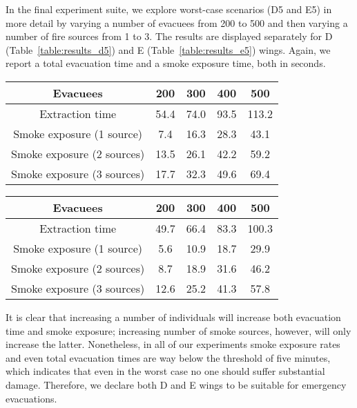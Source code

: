 In the final experiment suite, we explore worst-case scenarios (D5 and E5) in
more detail by varying a number of evacuees from 200 to 500 and then varying
a number of fire sources from 1 to 3.
The results are displayed separately for D (Table~\ref{table:results_d5})
and E (Table~\ref{table:results_e5}) wings.
Again, we report a total evacuation time and a smoke exposure time,
both in seconds.

\begin{center}
    \label{table:results_d5}
    \begin{tabular}{ c | c | c | c | c }
        \hline
        Evacuees & 200 & 300 & 400 & 500 \\
        \hline
        Extraction time & 54.4 & 74.0 & 93.5 & 113.2 \\
        Smoke exposure (1 source) & 7.4 & 16.3 & 28.3 & 43.1 \\
        Smoke exposure (2 sources) & 13.5 & 26.1 & 42.2 & 59.2 \\
        Smoke exposure (3 sources) & 17.7 & 32.3 & 49.6 & 69.4 \\
        \hline
    \end{tabular}
\end{center}

\begin{center}
    \label{table:results_e5}
    \begin{tabular}{ c | c | c | c | c }
        \hline
        Evacuees & 200 & 300 & 400 & 500 \\
        \hline
        Extraction time & 49.7 & 66.4 & 83.3 & 100.3 \\
        Smoke exposure (1 source) & 5.6 & 10.9 & 18.7 & 29.9 \\
        Smoke exposure (2 sources) & 8.7 & 18.9 & 31.6 & 46.2 \\
        Smoke exposure (3 sources) & 12.6 & 25.2 & 41.3 & 57.8 \\
        \hline
    \end{tabular}
\end{center}

It is clear that increasing a number of individuals will increase both
evacuation time and smoke exposure; increasing number of smoke sources, however,
will only increase the latter.
Nonetheless, in all of our experiments smoke exposure rates and even total
evacuation times are way below the threshold of five minutes, which indicates
that even in the worst case no one should suffer substantial damage.
Therefore, we declare both D and E wings to be suitable for emergency
evacuations.

